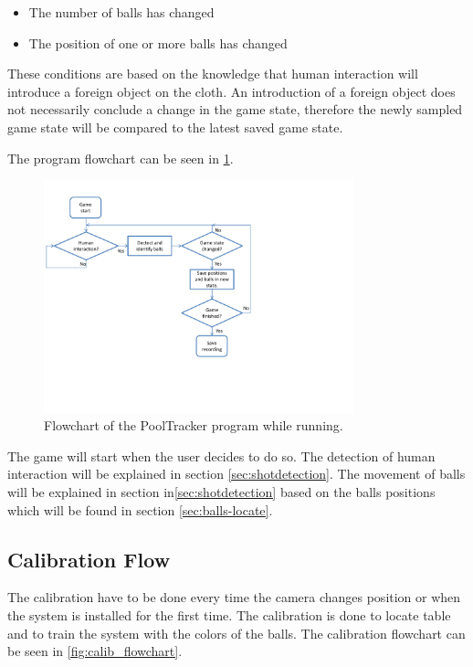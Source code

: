 \begin{itemize}
	\item The number of balls has changed
	\item The position of one or more balls has changed
\end{itemize}

These conditions are based on the knowledge that human interaction will introduce a foreign object on the cloth.  An introduction of a foreign object does not necessarily conclude a change in the game state, therefore the newly sampled game state will be compared to the latest saved game state.

The program flowchart can be seen in \ref{fig:program_flowchart}.\\

\begin{figure}[H]
\begin{center}
\leavevmode
\includegraphics[width=0.8\textwidth]{images/program_flowchart}
\end{center}
\caption{Flowchart of the PoolTracker program while running.}
\label{fig:program_flowchart}
\end{figure}

The game will start when the user decides to do so. The detection of human interaction will be explained in section \ref{sec:shotdetection}. The movement of balls will be explained in section in\ref{sec:shotdetection} based on the balls positions which will be found in section \ref{sec:balls-locate}.

\subsection{Calibration Flow}
The calibration have to be done every time the camera changes position or when the system is installed for the first time. The calibration is done to locate table and to train the system with the colors of the balls. The calibration flowchart can be seen in \ref{fig:calib_flowchart}.\\

